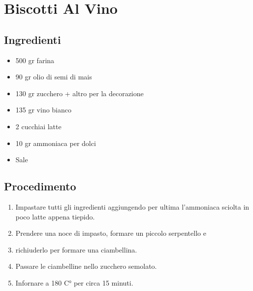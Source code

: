 \section{Biscotti Al Vino}
\subsection{Ingredienti}
\begin{itemize}
\item 500 gr farina  
\item 90 gr olio di semi di mais  
\item 130 gr zucchero + altro per la decorazione  
\item 135 gr vino bianco  
\item 2 cucchiai latte   
\item 10 gr ammoniaca per dolci  
\item Sale
\end{itemize}
\subsection{Procedimento}
\begin{enumerate}
\item  Impastare tutti gli ingredienti aggiungendo per ultima l'ammoniaca sciolta in poco latte appena tiepido.  
\item  Prendere una noce di impasto, formare un piccolo serpentello e   
\item  richiuderlo per formare una ciambellina.  
\item  Passare le ciambelline nello zucchero semolato.  
\item  Infornare a 180 C° per circa 15 minuti.
\end{enumerate}
